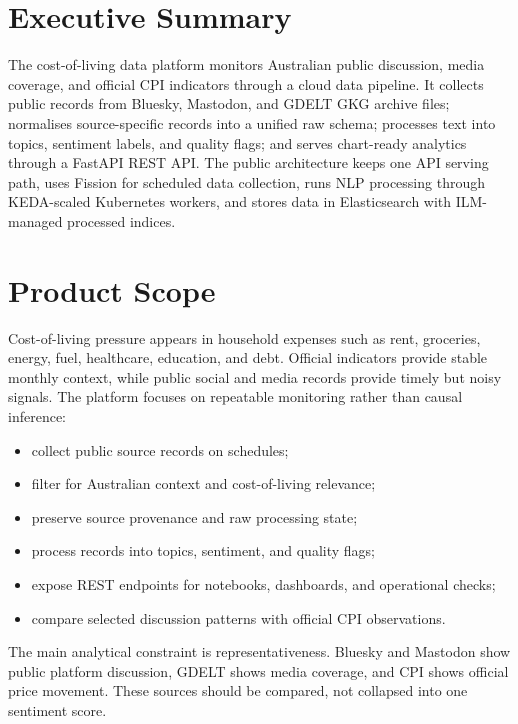 \documentclass[11pt,a4paper]{article}
\begin{document}
\section*{Executive Summary}
The cost-of-living data platform monitors Australian public discussion, media coverage, and official CPI indicators through a cloud data pipeline. It collects public records from Bluesky, Mastodon, and GDELT GKG archive files; normalises source-specific records into a unified raw schema; processes text into topics, sentiment labels, and quality flags; and serves chart-ready analytics through a FastAPI REST API. The public architecture keeps one API serving path, uses Fission for scheduled data collection, runs NLP processing through KEDA-scaled Kubernetes workers, and stores data in Elasticsearch with ILM-managed processed indices.

\newpage
\tableofcontents
\newpage

\section{Product Scope}

Cost-of-living pressure appears in household expenses such as rent, groceries, energy, fuel, healthcare, education, and debt. Official indicators provide stable monthly context, while public social and media records provide timely but noisy signals. The platform focuses on repeatable monitoring rather than causal inference:

\begin{itemize}
    \item collect public source records on schedules;
    \item filter for Australian context and cost-of-living relevance;
    \item preserve source provenance and raw processing state;
    \item process records into topics, sentiment, and quality flags;
    \item expose REST endpoints for notebooks, dashboards, and operational checks;
    \item compare selected discussion patterns with official CPI observations.
\end{itemize}

The main analytical constraint is representativeness. Bluesky and Mastodon show public platform discussion, GDELT shows media coverage, and CPI shows official price movement. These sources should be compared, not collapsed into one sentiment score.
\end{document}
